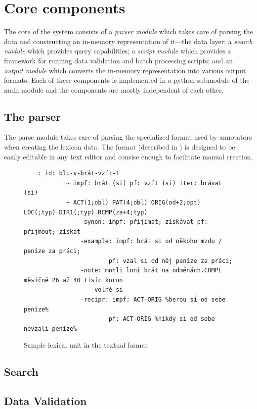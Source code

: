 \documentclass[10pt, a4paper, twocolumn]{article} %
\begin{document}
\section{Core components}
The core of the system consists of a \emph{parser module} which takes care of parsing the data and
constructing an in-memory representation of it---the data layer; a \emph{search module} which
provides query capabilities; a \emph{script module} which provides a framework for running data validation
and batch processing scripts; and an \emph{output module} which converts the in-memory representation into
various output formats. Each of these components is implemented in a python submodule of the main 
module and the components are mostly independent of each other.

\subsection{The parser}
The parse module takes care of parsing the specialized format used by annotators when creating the lexicon
data. The format (described in \cite{vallex}) is designed to be easily editable in any text editor and consise enough to facilitate manual creation.

\begin{figure}
\tiny
\begin{verbatim}
    : id: blu-v-brát-vzít-1
            ~ impf: brát (si) pf: vzít (si) iter: brávat (si)
            + ACT(1;obl) PAT(4;obl) ORIG(od+2;opt) LOC(;typ) DIR1(;typ) RCMP(za+4;typ)
                -synon: impf: přijímat; získávat pf: přijmout; získat
                -example: impf: brát si od někoho mzdu / peníze za práci;
                        pf: vzal si od něj peníze za práci;
                -note: mohli loni brát na odměnách.COMPL měsíčně 26 až 40 tisíc korun
                    volné si
                -recipr: impf: ACT-ORIG %berou si od sebe peníze%
                        pf: ACT-ORIG %nikdy si od sebe nevzali peníze%
\end{verbatim}
\caption{Sample lexical unit in the textual format}
\end{figure}


\subsection{Search}
\subsection{Data Validation}
\end{document}

